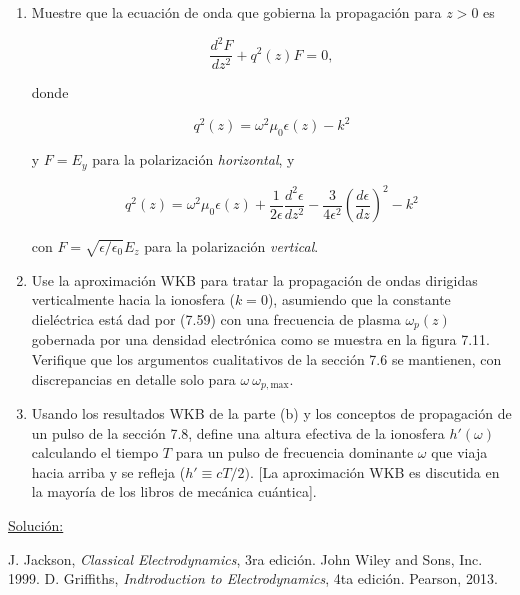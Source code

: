 \documentclass[a4paper,11pt]{article}
\numberwithin{equation}{section}
\begin{document}
\begin{enumerate}[label=\textbf{(\alph*)}]
 \item Muestre que la ecuación de onda que gobierna la propagación para $z > 0$ 
 es 
 
 $$
 \frac{d^2 F}{dz^2} + q^2(z) F = 0,
 $$
 
 donde 
 
 $$
 q^2(z) = \omega^2 \mu_0 \epsilon(z) - k^2
 $$
 
 y $F = E_y$ para la polarización \emph{horizontal}, y 
 
 $$
 q^2(z) = \omega^2 \mu_0 \epsilon(z) + \frac{1}{2\epsilon}\frac{d^2 \epsilon}{dz^2} 
 - \frac{3}{4\epsilon^2}\left(\frac{d \epsilon}{d z} \right)^2 - k^2
 $$
 
 con $F = \sqrt{\epsilon/\epsilon_0}E_z$ para la polarización \emph{vertical}.
 
 \item Use la aproximación WKB para tratar la propagación de ondas dirigidas 
 verticalmente hacia la ionosfera ($k = 0$), asumiendo que la constante dieléctrica 
 está dad por (7.59) con una frecuencia de plasma $\omega_p(z)$ gobernada por una 
 densidad electrónica como se muestra en la figura 7.11. Verifique que los argumentos 
 cualitativos de la sección 7.6 se mantienen, con discrepancias en detalle solo 
 para $\omega ~ \omega_{p,\text{max}}$.
 
 \item Usando los resultados WKB de la parte (b) y los conceptos de propagación 
 de un pulso de la sección 7.8, define una altura efectiva de la ionosfera $h'(\omega)$ 
 calculando el tiempo $T$ para un pulso de frecuencia dominante $\omega$ que viaja 
 hacia arriba y se refleja ($h' \equiv cT/2)$. [La aproximación WKB es discutida 
 en la mayoría de los libros de mecánica cuántica].
\end{enumerate}

\vspace{.3cm}

\underline{Solución:} \vspace{.3cm}

\newpage

\begin{thebibliography}{10}
J. Jackson, \emph{Classical Electrodynamics}, 3ra edición. John Wiley and Sons, Inc. 
1999.
D. Griffiths, \emph{Indtroduction to Electrodynamics}, 4ta edición. Pearson, 2013.
\end{thebibliography}
\end{document}
